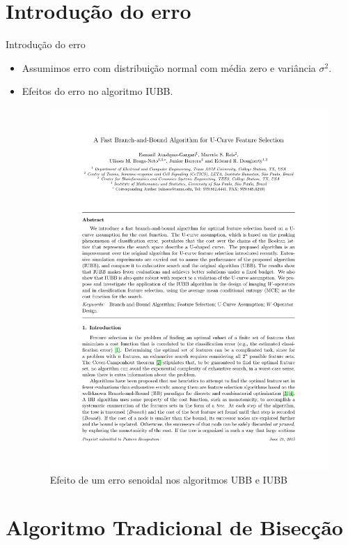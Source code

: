 \documentclass{beamer}
\begin{document}
\section{Introdução do erro}
\begin{frame}{Introdução do erro}
    \begin{itemize}
        \item{Assumimos erro com distribuição normal com média zero e
            variância $\sigma^2$.}
        \item{Efeitos do erro no algoritmo IUBB.}
        \begin{figure}[h]
            \includegraphics[page=15, clip, trim=12cm 10.7cm 3cm 12cm,
                scale=.8]{IUBB_submit}
            \caption{Efeito de um erro senoidal nos algoritmos UBB e 
                IUBB \cite{iubb}}
        \end{figure}
    \end{itemize}
\end{frame}

\section{Algoritmo Tradicional de Bisecção}
\begin{frame}
    \begin{itemize}
    \end{itemize}
\end{frame}
\end{document}
